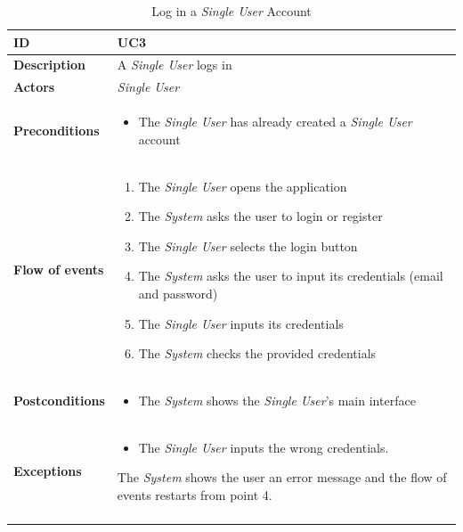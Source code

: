 \documentclass[titlepage]{article}
\begin{document}
\begin{longtable}{| p{3 cm} | p{10 cm} |} 
			\hline
			{\bf ID} & UC3 \\
			\hline
			{\bf Description} & A {\it Single User} logs in\\
			\hline
			{\bf Actors} & {\it Single User} \\
			\hline
			{\bf Preconditions} & 		
							\begin{itemize}
								\item The {\it Single User}  has already created a {\it Single User} account 
							\end{itemize}
			\\
			\hline
			{\bf Flow of events} & 
							\begin{enumerate}
								\item The {\it Single User} opens the application
								\item The {\it System} asks the user to login or register
								\item The {\it Single User} selects the login button
								\item The {\it System} asks the user to input its credentials (email and password)
								\item The {\it Single User} inputs its credentials
								\item The {\it System} checks the provided credentials

							\end{enumerate}
			
			 \\
			\hline
			{\bf Postconditions} & 
							\begin{itemize}
								\item The {\it System} shows the {\it Single User}’s main interface
							\end{itemize}
			\\
			\hline
			{\bf Exceptions} & 
							\begin{itemize}
								\item The {\it Single User} inputs the wrong credentials. 
							\end{itemize}
							The {\it System} shows the user an error message and the flow of events 							restarts from point 4.
							
			\\
			\hline
			\caption{Log in a {\it Single User} Account}
			\end{longtable}
\end{document}
